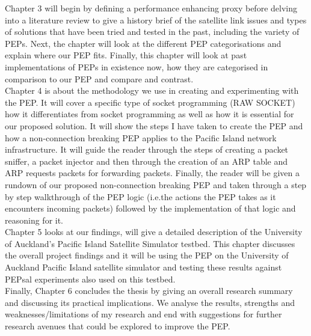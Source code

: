 Chapter 3 will begin by defining a performance enhancing proxy before delving into a literature review to give a history brief of the satellite link issues and types of solutions that have been tried and tested in the past, including the variety of PEPs. Next, the chapter will look at the different PEP categorisations and explain where our PEP fits. Finally, this chapter will look at past implementations of PEPs in existence now, how they are categorised in comparison to our PEP and compare and contrast. \\ 

Chapter 4 is about the methodology we use in creating and experimenting with the PEP. It will cover a specific type of socket programming (RAW SOCKET) how it differentiates from socket programming as well as how it is essential for our proposed solution. It will show the steps I have taken to create the PEP and how a non-connection breaking PEP applies to the Pacific Island network infrastructure. It will guide the reader through the steps of creating a packet sniffer, a packet injector and then through the creation of an ARP table and ARP requests packets for forwarding packets. Finally, the reader will be given a rundown of our proposed non-connection breaking PEP and taken through a step by step walkthrough of the PEP logic (i.e.the actions the PEP takes as it encounters incoming packets) followed by the implementation of that logic and reasoning for it.\\

Chapter 5 looks at our findings, will give a detailed description of the University of Auckland's Pacific Island Satellite Simulator testbed. This chapter discusses the overall project findings and it will be using the PEP on the University of Auckland Pacific Island satellite simulator and testing these results against PEPsal experiments also used on this testbed.\\

Finally, Chapter 6 concludes the thesis by giving an overall research summary and discussing its practical implications. We analyse the results, strengths and weaknesses/limitations of my research and end with suggestions for further research avenues that could be explored to improve the PEP.

